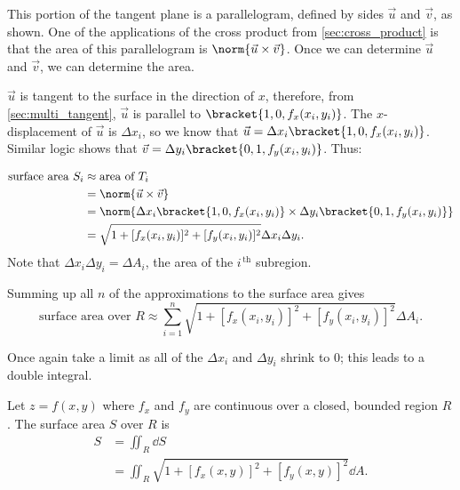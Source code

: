 This portion of the tangent plane is a parallelogram, defined by sides $\vec u$ and $\vec v$, as shown. One of the applications of the cross product from \autoref{sec:cross_product} is that the area of this parallelogram is $\norm{\vec u\times \vec v}$. Once we can determine $\vec u$ and $\vec v$, we can determine the area.

$\vec u$ is tangent to the surface in the direction of $x$, therefore, from \autoref{sec:multi_tangent}, $\vec u$ is parallel to $\bracket{1,0,f_x(x_i,y_i)}$. The $x$-displacement of $\vec u$ is $\Delta x_i$, so we know that $\vec u = \Delta x_i\bracket{1,0,f_x(x_i,y_i)}$. Similar logic shows that $\vec v = \Delta y_i\bracket{0,1,f_y(x_i,y_i)}$. Thus:

\begin{align*}
\text{surface area $S_i$}
	&\approx \text{area of  $T_i$}\\
	&= \norm{\vec u\times \vec v}\\
	&= \norm{\Delta x_i\bracket{1,0,f_x(x_i,y_i)}\times\Delta y_i\bracket{0,1,f_y(x_i,y_i)}}\\
	&=\sqrt{1+[f_x(x_i,y_i)]^2+[f_y(x_i,y_i)]^2}\Delta x_i\Delta y_i.
\end{align*}
Note that $\Delta x_i\Delta y_i = \Delta A_i$, the area of the $i^{\,\text{th}}$ subregion.

Summing up all $n$ of the approximations to the surface area gives
\[\text{surface area over $R$} \approx \sum_{i=1}^n \sqrt{1+[f_x(x_i,y_i)]^2+[f_y(x_i,y_i)]^2}\Delta A_i.\]

Once again take a limit as all of the $\Delta x_i$ and $\Delta y_i$ shrink to 0; this leads to a double integral.


\begin{definition}\label{def:surfacearea}
Let $z=f(x,y)$ where $f_x$ and $f_y$ are continuous over a closed, bounded region $R$. The surface area $S$ over $R$ is 
\begin{align*}
S &= \iint_R \dd S\\
&=\iint_R \sqrt{1+[f_x(x,y)]^2+[f_y(x,y)]^2}\dd A.
\end{align*}
\end{definition}


